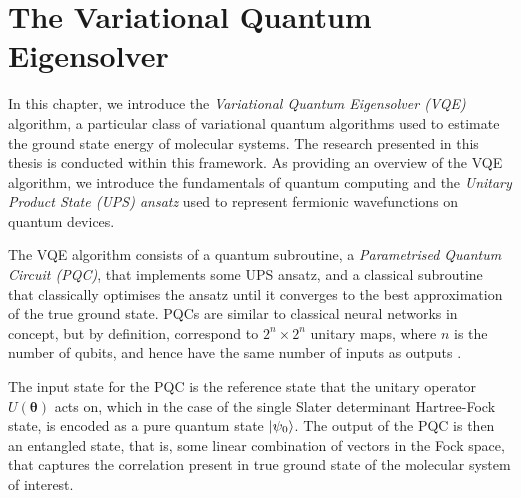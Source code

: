 \section{The Variational Quantum Eigensolver}%
\label{vqe}






In this chapter, we introduce the \textit{Variational Quantum Eigensolver (VQE)} algorithm, a particular class of variational quantum algorithms used to estimate the ground state energy of molecular systems. The research presented in this thesis is conducted within this framework. As providing an overview of the VQE algorithm, we introduce the fundamentals of quantum computing and the \textit{Unitary Product State (UPS) ansatz} used to represent fermionic wavefunctions on quantum devices.

The VQE algorithm consists of a quantum subroutine, a \textit{Parametrised Quantum Circuit (PQC)}, that implements some UPS ansatz, and a classical subroutine that classically optimises the ansatz until it converges to the best approximation of the true ground state. PQCs are similar to classical neural networks in concept, but by definition, correspond to $2^n \times 2^n$ unitary maps, where $n$ is the number of qubits, and hence have the same number of inputs as outputs \cite{Yeung2020}.

The input state for the PQC is the reference state that the unitary operator $U(\bm\theta)$ acts on, which in the case of the single Slater determinant Hartree-Fock state, is encoded as a pure quantum state $\ket{\psi_0}$. The output of the PQC is then an entangled state, that is, some linear combination of vectors in the Fock space, that captures the correlation present in true ground state of the molecular system of interest.

